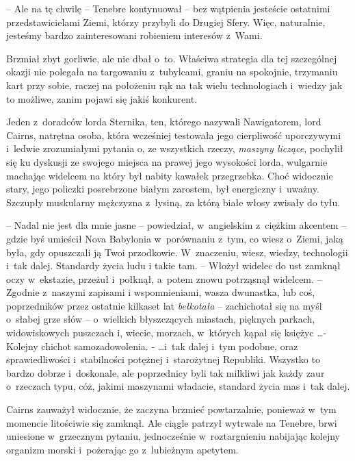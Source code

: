 \documentclass[oneside,polish,12pt,sfheadings]{mwbk}
\begin{document}
-- Ale na tę chwilę -- Tenebre kontynuował -- bez wątpienia jesteście
ostatnimi przedstawicielami Ziemi, którzy przybyli do Drugiej Sfery.
Więc, naturalnie, jesteśmy bardzo zainteresowani robieniem interesów z~Wami.

Brzmiał zbyt gorliwie, ale nie dbał o~to. Właściwa strategia dla tej
szczególnej okazji nie polegała na targowaniu z~tubylcami, graniu na
spokojnie, trzymaniu kart przy sobie, raczej na położeniu rąk na tak
wielu technologiach i~wiedzy jak to możliwe, zanim pojawi się jakiś
konkurent.

Jeden z~doradców lorda Sternika, ten, którego nazywali Nawigatorem, lord
Cairns, natrętna osoba, która wcześniej testowała jego cierpliwość
uporczywymi i~ledwie zrozumiałymi pytania o, ze wszystkich rzeczy,
\emph{maszyny liczące}, pochylił się ku dyskusji ze swojego miejsca na
prawej jego wysokości lorda, wulgarnie machając widelcem na który był
nabity kawałek przegrzebka. Choć widocznie stary, jego policzki
posrebrzone białym zarostem, był energiczny i~uważny. Szczupły
muskularny mężczyzna z~łysiną, za którą białe włosy zwisały do tyłu.

-- Nadal nie jest dla mnie jasne -- powiedział, w~angielskim z~ciężkim
akcentem -- gdzie byś umieścił Nova Babylonia w~porównaniu z~tym, co
wiesz o~Ziemi, jaką była, gdy opuszczali ją Twoi przodkowie. W~znaczeniu, wiesz, wiedzy, technologii i~tak dalej. Standardy życia ludu
i takie tam. -- Włożył widelec do ust zamknął oczy w~ekstazie, przeżuł i~połknął, a~potem znowu potrząsnął widelcem. -- Zgodnie z~naszymi zapisami
i wspomnieniami, wasza dwunastka, lub coś, poprzedników przez ostatnie
kilkaset lat \emph{bełkotała} -- zachichotał się na myśl o~słabej grze
słów -- o~wielkich błyszczących miastach, pięknych parkach, widowiskowych
puszczach i, wiecie, morzach, w~których kąpał się księżyc \ldots -
Kolejny chichot samozadowolenia. - \ldots i~tak dalej i~tym podobne, oraz
sprawiedliwości i~stabilności potężnej i~starożytnej Republiki. Wszystko
to bardzo dobrze i~doskonale, ale poprzednicy byli tak milkliwi jak
każdy zaur o~rzeczach typu, cóż, jakimi maszynami władacie, standard
życia mas i~tak dalej.

Cairns zauważył widocznie, że zaczyna brzmieć powtarzalnie, ponieważ w~tym momencie litościwie się zamknął. Ale ciągle patrzył wytrwale na
Tenebre, brwi uniesione w~grzecznym pytaniu, jednocześnie w~roztargnieniu nabijając kolejny organizm morski i~pożerając go z~lubieżnym apetytem.
\end{document}
